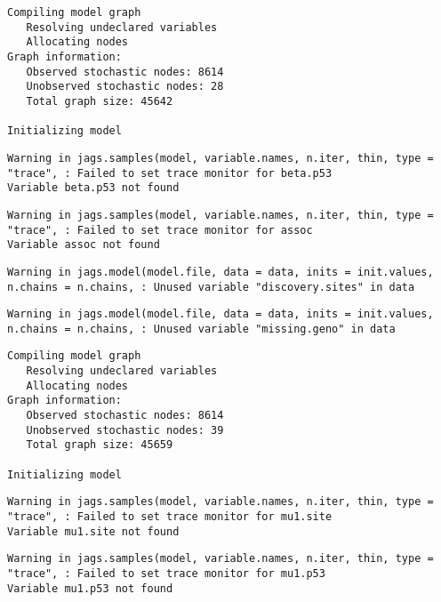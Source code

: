 \documentclass[12pt,twoside]{dukestatscithesis}
\theoremstyle{definition}
\theoremstyle{definition}
\theoremstyle{definition}
\theoremstyle{remark}
\begin{document}
\begin{verbatim}
Compiling model graph
   Resolving undeclared variables
   Allocating nodes
Graph information:
   Observed stochastic nodes: 8614
   Unobserved stochastic nodes: 28
   Total graph size: 45642

Initializing model
\end{verbatim}
\begin{verbatim}
Warning in jags.samples(model, variable.names, n.iter, thin, type = "trace", : Failed to set trace monitor for beta.p53
Variable beta.p53 not found
\end{verbatim}
\begin{verbatim}
Warning in jags.samples(model, variable.names, n.iter, thin, type = "trace", : Failed to set trace monitor for assoc
Variable assoc not found
\end{verbatim}
\begin{Shaded}
\begin{Highlighting}[]
\StringTok{ }\NormalTok{(}\NormalTok{, }
\end{Highlighting}
\end{Shaded}
\begin{verbatim}
Warning in jags.model(model.file, data = data, inits = init.values,
n.chains = n.chains, : Unused variable "discovery.sites" in data
\end{verbatim}
\begin{verbatim}
Warning in jags.model(model.file, data = data, inits = init.values,
n.chains = n.chains, : Unused variable "missing.geno" in data
\end{verbatim}
\begin{verbatim}
Compiling model graph
   Resolving undeclared variables
   Allocating nodes
Graph information:
   Observed stochastic nodes: 8614
   Unobserved stochastic nodes: 39
   Total graph size: 45659

Initializing model
\end{verbatim}
\begin{verbatim}
Warning in jags.samples(model, variable.names, n.iter, thin, type = "trace", : Failed to set trace monitor for mu1.site
Variable mu1.site not found
\end{verbatim}
\begin{verbatim}
Warning in jags.samples(model, variable.names, n.iter, thin, type = "trace", : Failed to set trace monitor for mu1.p53
Variable mu1.p53 not found
\end{verbatim}
\end{document}
